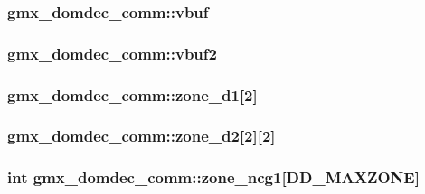\hypertarget{structgmx__domdec__comm_a09e845091f06773e1101109de5493713}{
\subsubsection[{vbuf}]{ {\bf gmx\-\_\-domdec\-\_\-comm\-::vbuf}}}\label{structgmx__domdec__comm_a09e845091f06773e1101109de5493713}
\hypertarget{structgmx__domdec__comm_a658045de0c480545a520c741414b4577}{
\subsubsection[{vbuf2}]{ {\bf gmx\-\_\-domdec\-\_\-comm\-::vbuf2}}}\label{structgmx__domdec__comm_a658045de0c480545a520c741414b4577}
\hypertarget{structgmx__domdec__comm_ab348bf3b7b7fc15af2f8e21d46ec91d3}{
\subsubsection[{zone\-\_\-d1}]{ {\bf gmx\-\_\-domdec\-\_\-comm\-::zone\-\_\-d1}\mbox{[}2\mbox{]}}}\label{structgmx__domdec__comm_ab348bf3b7b7fc15af2f8e21d46ec91d3}
\hypertarget{structgmx__domdec__comm_a7c9f3e9bc152fd7576bf4ab3f85d8aca}{
\subsubsection[{zone\-\_\-d2}]{ {\bf gmx\-\_\-domdec\-\_\-comm\-::zone\-\_\-d2}\mbox{[}2\mbox{]}\mbox{[}2\mbox{]}}}\label{structgmx__domdec__comm_a7c9f3e9bc152fd7576bf4ab3f85d8aca}
\hypertarget{structgmx__domdec__comm_a27ac63a2c406c38d6181cdb042ea1d63}{
\subsubsection[{zone\-\_\-ncg1}]{\setlength{\rightskip}{0pt plus 5cm}int {\bf gmx\-\_\-domdec\-\_\-comm\-::zone\-\_\-ncg1}\mbox{[}{\bf \-D\-D\-\_\-\-M\-A\-X\-Z\-O\-N\-E}\mbox{]}}}\label{structgmx__domdec__comm_a27ac63a2c406c38d6181cdb042ea1d63}
